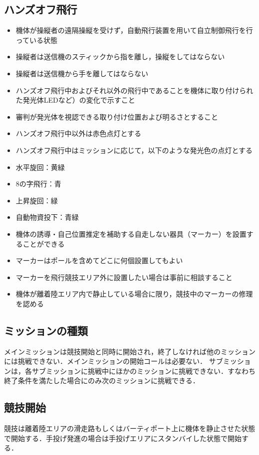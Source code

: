 \documentclass[a4paper,12pt,oneside]{jsarticle}
\begin{document}
\subsection{ハンズオフ飛行}
\begin{itemize}
  \item 機体が操縦者の遠隔操縦を受けず，自動飛行装置を用いて自立制御飛行を行っている状態
  \item 操縦者は送信機のスティックから指を離し，操縦をしてはならない
  \item 操縦者は送信機から手を離してはならない
  \item ハンズオフ飛行中およびそれ以外の飛行中であることを機体に取り付けられた発光体LEDなど）の変化で示すこと
  \item 審判が発光体を視認できる取り付け位置および明るさとすること
  \item ハンズオフ飛行中以外は赤色点灯とする
  \item ハンズオフ飛行中はミッションに応じて，以下のような発光色の点灯とする
  \item 水平旋回：黄緑
  \item 8の字飛行：青
  \item 上昇旋回：緑
  \item 自動物資投下：青緑
  \item 機体の誘導・自己位置推定を補助する自走しない器具（マーカー）を設置することができる
  \item マーカーはポールを含めてどこに何個設置してもよい
  \item マーカーを飛行競技エリア外に設置したい場合は事前に相談すること
  \item 機体が離着陸エリア内で静止している場合に限り，競技中のマーカーの修理を認める
\end{itemize}

\subsection{ミッションの種類}
メインミッションは競技開始と同時に開始され，終了しなければ他のミッションには挑戦できない．メインミッションの開始コールは必要ない．
サブミッションは，各サブミッションに挑戦中にほかのミッションに挑戦できない．すなわち終了条件を満たした場合にのみ次のミッションに挑戦できる．

\subsection{競技開始}
競技は離着陸エリアの滑走路もしくはバーティポート上に機体を静止させた状態で開始する．手投げ発進の場合は手投げエリアにスタンバイした状態で開始する．
\end{document}
